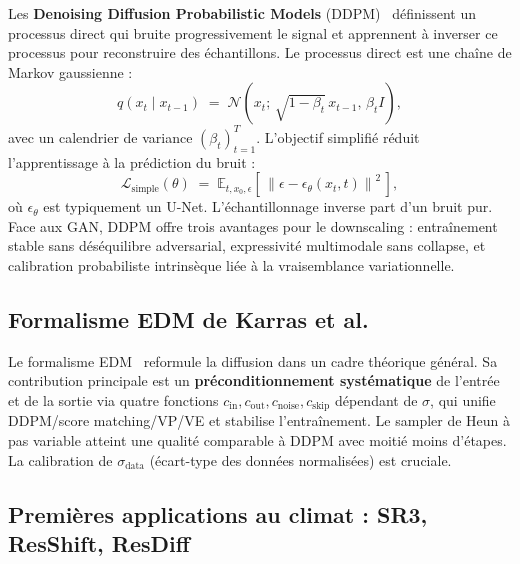 \documentclass[14pt,a4paper,openany]{extreport}
\theoremstyle{definition}
\begin{document}
Les \textbf{Denoising Diffusion Probabilistic Models} (DDPM)~\cite{ho_ddpm_2020} définissent un processus direct qui bruite progressivement le signal et apprennent à inverser ce processus pour reconstruire des échantillons. Le processus direct est une chaîne de Markov gaussienne :
\begin{equation}
  q(x_t \mid x_{t-1}) \;=\; \mathcal{N}\!\left(x_t;\, \sqrt{1 - \beta_t}\, x_{t-1},\, \beta_t I\right),
  \label{eq:ddpm-forward}
\end{equation}
avec un calendrier de variance $(\beta_t)_{t=1}^{T}$. L'objectif simplifié réduit l'apprentissage à la prédiction du bruit :
\begin{equation}
  \mathcal{L}_{\mathrm{simple}}(\theta) \;=\; \mathbb{E}_{t, x_0, \epsilon}\!\left[\,\left\| \epsilon - \epsilon_\theta(x_t, t) \right\|^2\,\right],
  \label{eq:ddpm-loss}
\end{equation}
où $\epsilon_\theta$ est typiquement un U-Net. L'échantillonnage inverse part d'un bruit pur. Face aux GAN, DDPM offre trois avantages pour le downscaling : entraînement stable sans déséquilibre adversarial, expressivité multimodale sans collapse, et calibration probabiliste intrinsèque liée à la vraisemblance variationnelle.

\subsection{Formalisme EDM de Karras et al.}
\label{ssec:soa-edm}

Le formalisme EDM~\cite{karras_edm_2022} reformule la diffusion dans un cadre théorique général. Sa contribution principale est un \textbf{préconditionnement systématique} de l'entrée et de la sortie via quatre fonctions $c_{\mathrm{in}}, c_{\mathrm{out}}, c_{\mathrm{noise}}, c_{\mathrm{skip}}$ dépendant de $\sigma$, qui unifie DDPM/score matching/VP/VE et stabilise l'entraînement. Le sampler de Heun à pas variable atteint une qualité comparable à DDPM avec moitié moins d'étapes. La calibration de $\sigma_{\mathrm{data}}$ (écart-type des données normalisées) est cruciale.

\subsection{Premières applications au climat : SR3, ResShift, ResDiff}
\label{ssec:soa-sr3-resdiff}
\end{document}
